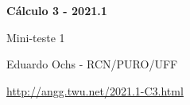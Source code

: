 \documentclass[oneside,12pt]{article}
\begin{document}


%
%

\def\drafturl{http://angg.twu.net/LATEX/2021-1-C3.pdf}
\def\drafturl{http://angg.twu.net/2021.1-C3.html}
\def\draftfooter{\tiny \href{\drafturl}{\jobname{}} \ColorBrown{\shorttoday{} \hours}}



%

\thispagestyle{empty}

\begin{center}

\vspace*{1.2cm}

{\bf \Large Cálculo 3 - 2021.1}

\bsk

Mini-teste 1

\bsk

Eduardo Ochs - RCN/PURO/UFF

\url{http://angg.twu.net/2021.1-C3.html}

\end{center}

\newpage
\end{document}
